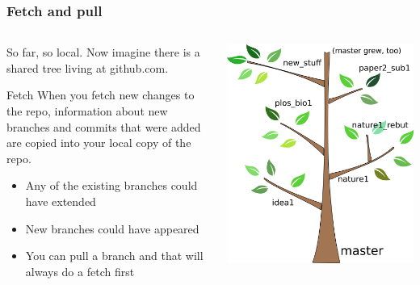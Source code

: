 \documentclass{beamer}
\begin{document}
\begin{frame}
  \frametitle{Fetch and pull}
  \begin{columns}[T]
    \begin{column}{.5\textwidth}
      So far, so local. Now imagine there is a shared tree living at github.com.
      \begin{block}{Fetch}
        When you \alert{fetch} new changes to the \alert{repo}, information
        about new branches and commits that were added are copied into your
        local copy of the repo.
        \begin{itemize}
        \item Any of the existing branches could have extended
        \item New branches could have appeared
        \item You can \alert{pull} a branch and that will always do a
          \alert{fetch} first
        \end{itemize}
      \end{block}
    \end{column}
    \begin{column}{.5\textwidth}
      \includegraphics[width=\textwidth]{tree_newbranches.png}
    \end{column}
  \end{columns}
\end{frame}
\end{document}
